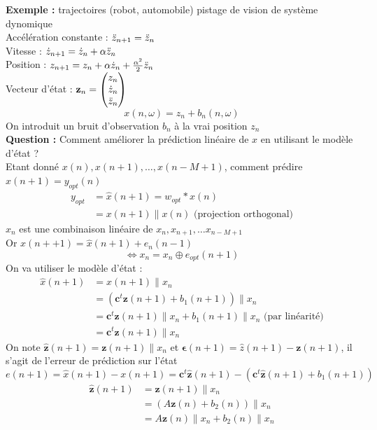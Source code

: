 \documentclass[12pt]{article}
\begin{document}
\textbf{Exemple :} trajectoires (robot, automobile) pistage de vision de système dynomique\\
Accélération constante : $\Ddot{z}_{n+1} = \Ddot{z}_n$\\
Vitesse : $\Dot{z}_{n+1} = \Dot{z}_n + \alpha \Ddot{z}_n$ \\
Position : $z_{n+1} = z_n + \alpha \Dot{z}_n + \frac{\alpha^2}{2} \Ddot{z}_n$ \\
Vecteur d'état : $\mathbf{z}_n = \begin{pmatrix}
    z_n \\
    \Dot{z}_n \\
    \Ddot{z}_n
\end{pmatrix}$
$$x(n,\omega) = z_n + b_n(n,\omega)$$
On introduit un bruit d'observation $b_n$ à la vrai position $z_n$\\
\textbf{Question :} Comment améliorer la prédiction linéaire de $x$ en utilisant le modèle d'état ? \\
Etant donné $x(n), x(n+1), \dots, x(n-M+1)$, comment prédire $\hat{x}(n+1) = y_{opt}(n)$
\begin{align}
    y_{opt} &= \hat{x}(n+1) = w_{opt} * x(n) \nonumber \\
    &= x(n+1)\|x(n) \text{ (projection orthogonal)} \nonumber
\end{align}
$x_n$ est une combinaison linéaire de $x_n, x_{n+1}, \dots x_{n-M+1}$\\
Or $x(n++1) = \hat{x}(n+1) + e_n(n-1)$
$$\Leftrightarrow x_n = x_n \oplus e_{opt}(n+1)$$
On va utiliser le modèle d'état : 
\begin{align}
    \hat{x}(n+1) &= x(n+1)\| x_n \nonumber \\
    &= \left( \mathbf{c}^t \mathbf{z}(n+1) + b_1(n+1) \right)\| x_n \nonumber \\
    &= \mathbf{c}^t \mathbf{z}(n+1) \| x_n + b_1(n+1) \| x_n \text{ (par linéarité)} \nonumber \\
    &= \mathbf{c}^t \mathbf{z}(n+1) \| x_n \nonumber
\end{align}
On note $\hat{\mathbf{z}}(n+1) = \mathbf{z}(n+1) \| x_n$ et $\mathbf{\epsilon}(n+1) = \hat{z}(n+1) - \mathbf{z}(n+1)$, il s'agit de l'erreur de prédiction sur l'état
$$e(n+1) = \hat{x}(n+1) - x(n+1) = \mathbf{c}^t \hat{\mathbf{z}}(n+1) - (\mathbf{c}^t \hat{\mathbf{z}}(n+1) + b_1(n+1))$$
\begin{align}
    \hat{\mathbf{z}}(n+1) &= \mathbf{z}(n+1) \|x_n \nonumber \\
    &= (A\mathbf{z}(n) + b_2(n))\| x_n \nonumber \\
    &= A \mathbf{z}(n) \| x_n + b_2(n) \| x_n \nonumber
\end{align}
\end{document}
